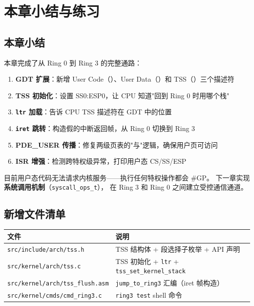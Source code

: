 \section{本章小结与练习}

\subsection{本章小结}

本章完成了从 Ring 0 到 Ring 3 的完整通路：

\begin{enumerate}
  \item \textbf{GDT 扩展}：新增 User Code（）、User Data（）和 TSS（）三个描述符
  \item \textbf{TSS 初始化}：设置 SS0:ESP0，让 CPU 知道"回到 Ring 0 时用哪个栈"
  \item \textbf{\texttt{ltr} 加载}：告诉 CPU TSS 描述符在 GDT 中的位置
  \item \textbf{\texttt{iret} 跳转}：构造假的中断返回帧，从 Ring 0 切换到 Ring 3
  \item \textbf{PDE\_USER 传播}：修复两级页表的"与"逻辑，确保用户页可访问
  \item \textbf{ISR 增强}：检测跨特权级异常，打印用户态 CS/SS/ESP
\end{enumerate}

目前用户态代码无法请求内核服务——执行任何特权操作都会 \#GP。
下一章实现\textbf{系统调用机制}（\texttt{syscall\_ops\_t}），
在 Ring 3 和 Ring 0 之间建立受控通信通道。

\subsection{新增文件清单}

\begin{center}
\begin{tabular}{ll}
\toprule
\textbf{文件} & \textbf{说明} \\
\midrule
\texttt{src/include/arch/tss.h}        & TSS 结构体 + 段选择子枚举 + API 声明 \\
\texttt{src/kernel/arch/tss.c}         & TSS 初始化 + \texttt{ltr} + \texttt{tss\_set\_kernel\_stack} \\
\texttt{src/kernel/arch/tss\_flush.asm} & \texttt{jump\_to\_ring3} 汇编（iret 帧构造） \\
\texttt{src/kernel/cmds/cmd\_ring3.c}   & \texttt{ring3 test} shell 命令 \\
\bottomrule
\end{tabular}
\end{center}

